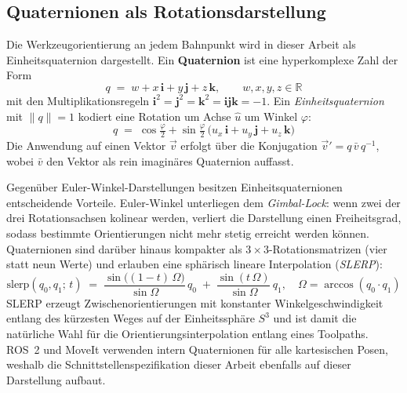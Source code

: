         \subsection{Quaternionen als Rotationsdarstellung}\label{subsec:quaternions}
        Die Werkzeugorientierung an jedem Bahnpunkt wird in dieser Arbeit als Einheitsquaternion dargestellt.
        Ein \textbf{Quaternion} ist eine hyperkomplexe Zahl der Form
        \begin{equation}
            q \;=\; w + x\,\mathbf{i} + y\,\mathbf{j} + z\,\mathbf{k},
            \qquad w,x,y,z \in \mathbb{R}
            \label{eq:quaternion}
        \end{equation}
        mit den Multiplikationsregeln $\mathbf{i}^2 = \mathbf{j}^2 = \mathbf{k}^2 = \mathbf{ijk} = -1$.
        Ein \emph{Einheitsquaternion} mit $\|q\| = 1$ kodiert eine Rotation um Achse $\hat{u}$
        um Winkel $\varphi$:
        \begin{equation}
            q \;=\; \cos\!\tfrac{\varphi}{2}
                  + \sin\!\tfrac{\varphi}{2}\,\bigl(u_x\,\mathbf{i} + u_y\,\mathbf{j} + u_z\,\mathbf{k}\bigr)
            \label{eq:rotation-quaternion}
        \end{equation}
        Die Anwendung auf einen Vektor $\vec{v}$ erfolgt über die Konjugation
        $\vec{v}' = q\,\bar{v}\,q^{-1}$,
        wobei $\bar{v}$ den Vektor als rein imaginäres Quaternion auffasst.

        Gegenüber Euler-Winkel-Darstellungen besitzen Einheitsquaternionen entscheidende Vorteile.
        Euler-Winkel unterliegen dem \emph{Gimbal-Lock}:
        wenn zwei der drei Rotationsachsen kolinear werden, verliert die Darstellung einen Freiheitsgrad,
        sodass bestimmte Orientierungen nicht mehr stetig erreicht werden können.
        Quaternionen sind darüber hinaus kompakter als $3 \times 3$-Rotationsmatrizen
        (vier statt neun Werte) und erlauben eine sphärisch lineare Interpolation (\emph{SLERP}):
        \begin{equation}
            \mathrm{slerp}(q_0, q_1;\, t)
            \;=\;
            \frac{\sin\!\bigl((1-t)\,\Omega\bigr)}{\sin\Omega}\,q_0
            \;+\;
            \frac{\sin(t\,\Omega)}{\sin\Omega}\,q_1,
            \quad
            \Omega = \arccos(q_0 \cdot q_1)
            \label{eq:slerp}
        \end{equation}
        SLERP erzeugt Zwischenorientierungen mit konstanter Winkelgeschwindigkeit entlang des kürzesten
        Weges auf der Einheitssphäre $S^3$ und ist damit die natürliche Wahl für die
        Orientierungsinterpolation entlang eines Toolpaths.
        \ac{ROS}~2 und MoveIt verwenden intern Quaternionen für alle kartesischen Posen,
        weshalb die Schnittstellenspezifikation dieser Arbeit ebenfalls auf dieser Darstellung aufbaut.
        \cite{aristidouInverseKinematicsTechniques2018}
        \cite{shoemakeAnimatingRotationQuaternion1985}

